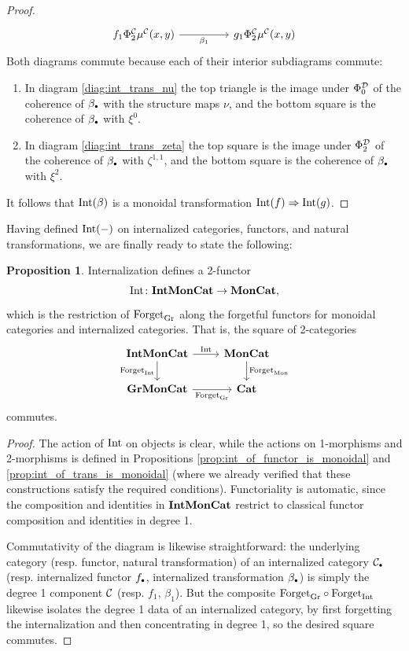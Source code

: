 \documentclass[openany, amssymb, psamsfonts]{amsart}
\theoremstyle{definition}
\newtheorem{prop}{Proposition}[section]
\numberwithin{equation}{section}
\begin{document}
\begin{proof}
\begin{equation}
\begin{tikzcd}[column sep = 4.5em]
    f_1\Phi^\C_2\mu^\C(x, y) \ar[r, "\beta_1"'] & g_1\Phi^\C_2\mu^\C(x,y)
\end{tikzcd} \label{diag:int_trans_zeta}
\end{equation}Both diagrams commute because each of their interior subdiagrams commute:
\begin{enumerate}
    \item In diagram \eqref{diag:int_trans_nu} the top triangle is the image under $\Phi^{\mathcal{D}}_0$ of the coherence of $\beta_\sbull$ with the structure maps $\nu$, and the bottom square is the coherence of $\beta_\sbull$ with $\xi^0$.

    \item In diagram \eqref{diag:int_trans_zeta} the top square is the image under $\Phi^{\mathcal{D}}_2$ of the coherence of $\beta_\sbull$ with $\zeta^{1,1}$, and the bottom square is the coherence of $\beta_\sbull$ with $\xi^2$.
\end{enumerate}
It follows that $\mathrm{Int}(\beta)$ is a monoidal transformation $\mathrm{Int}(f) \Rightarrow \mathrm{Int}(g)$.
\end{proof}

Having defined $\mathrm{Int}(-)$ on internalized categories, functors, and natural transformations, we are finally ready to state the following:

\begin{prop} \label{prop:int-functorial}
Internalization defines a 2-functor $$\mathrm{Int} \colon \textbf{\textup{IntMonCat}} \to \textbf{\textup{MonCat}},$$ which is the restriction of $\mathrm{Forget}_{\mathrm{Gr}}$ along the forgetful functors for monoidal categories and internalized categories. That is, the square of 2-categories
\begin{equation*}
\begin{tikzcd}
    \IntMonCat \ar[r, "\Int"] \ar[d, "\Forget_\Int"'] & \MonCat \ar[d, "\Forget_\Mon"] \\
    \GrMonCat \ar[r, "\Forget_\Gr"'] & \Cat
\end{tikzcd}
\end{equation*}commutes.
\end{prop}
\begin{proof}
The action of $\mathrm{Int}$ on objects is clear, while the actions on 1-morphisms and 2-morphisms is defined in Propositions \ref{prop:int_of_functor_is_monoidal} and \ref{prop:int_of_trans_is_monoidal} (where we already verified that these constructions satisfy the required conditions). Functoriality is automatic, since the composition and identities in $\textbf{\textup{IntMonCat}}$ restrict to classical functor composition and identities in degree 1.

Commutativity of the diagram is likewise straightforward: the underlying category (resp. functor, natural transformation) of an internalized category $\C_\sbull$ (resp. internalized functor $f_\sbull$, internalized transformation $\beta_\sbull$) is simply the degree 1 component $\mathcal{C}$ (resp. $f_1$, $\beta_1$). But the composite $\mathrm{Forget}_{\mathrm{Gr}} \circ \mathrm{Forget}_{\mathrm{Int}}$ likewise isolates the degree 1 data of an internalized category, by first forgetting the internalization and then concentrating in degree 1, so the desired square commutes.
\end{proof}
\end{document}

